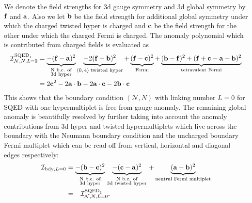 \documentclass{article}
\numberwithin{equation}{section}
\begin{document}
We denote the field strengths 
for 3d gauge symmetry and 3d global symmetry 
by ${\bf f}$ and ${\bf a}$. 
Also we let ${\bf b}$ be 
the field strength for additional global symmetry under which 
the charged twisted hyper is charged and 
${\bf c}$ be the field strength for the other under which 
the charged Fermi is charged. 
The anomaly polynomial which is contributed from 
charged fields is evaluated as 
\begin{align}
\label{sqed1_AN}
\mathcal{I}^{\textrm{SQED}_{1}}_{\mathcal{N}, N, L=0}
&=
\underbrace{
-({\bf f}-{\bf a})^{2}
}_{
\begin{smallmatrix}
\textrm{N b.c. of}\\
\textrm{3d hyper}
\end{smallmatrix}
}
\underbrace{
-2({\bf f}-{\bf b})^{2}
}_{\textrm{$(0,4)$ twisted hyper}}
+
\underbrace{
({\bf f}-{\bf c})^{2}
}_{\textrm{Fermi}}
+
\underbrace{
({\bf b}-{\bf f})^{2}
+
({\bf f}+{\bf c}-{\bf a}-{\bf b})^{2}
}_{\textrm{tetravalent Fermi}}
\nonumber\\
&=2{\bf c}^{2}-2{\bf a}\cdot {\bf b}-2{\bf a}\cdot {\bf c}-2{\bf b}\cdot {\bf c}
\end{align}
This shows that the boundary condition $(\mathcal{N},N)$ with linking number $L=0$ for  
SQED with one hypermultiplet is free from gauge anomaly. 
The remaining global anomaly is beautifully 
resolved by further taking into account the anomaly contributions from 
3d hyper and twisted hypermultiplets 
which live across the boundary with the Neumann boundary condition 
and the uncharged boundary Fermi multiplet 
which can be read off from vertical, horizontal and diagonal edges respectively: 
\begin{align}
\label{sqed1_AN2}
\mathcal{I}_{\textrm{bdy},L=0}
&=
\underbrace{
-({\bf b}-{\bf c})^{2}
}_{
\begin{smallmatrix}
\textrm{N b.c. of}\\
\textrm{3d hyper}
\end{smallmatrix}
}
\underbrace{
-({\bf c}-{\bf a})^{2}
}_{\begin{smallmatrix}
\textrm{N b.c. of}\\
\textrm{3d twisted hyper}
\end{smallmatrix}
}
+
\underbrace{
({\bf a}-{\bf b})^{2}
}_{\textrm{neutral Fermi multiplet}}
\nonumber\\
&=-\mathcal{I}^{\textrm{SQED}_{1}}_{\mathcal{N}, N, L=0}. 
\end{align}
\end{document}
